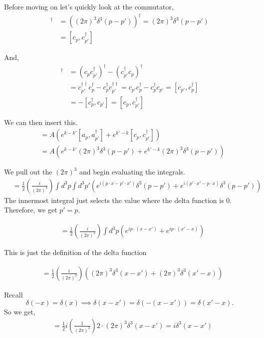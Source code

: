 \documentclass[working, oneside]{../../Preambles/tuftebook}
\begin{document}
\begin{solution}
Before moving on let's quickly look at the commutator,
\begin{align*}
[c_p, c_{p'}^\dagger]^\dagger &= \left( (2\pi)^3 \delta^3(p-p') \right)^\dagger = (2\pi)^3 \delta^3(p-p') \\
&= [c_p, c_{p'}^\dagger]
\end{align*}

And,
\begin{align*}
[c_p, c_{p'}^\dagger]^\dagger &= (c_p c_{p'}^\dagger)^\dagger - (c_{p'}^\dagger c_p)^\dagger \\
&= c_{p'}^{\dagger \dagger} c_p^\dagger - c_p^\dagger c_{p'}^{\dagger \dagger} = c_{p'} c_p^\dagger - c_p^\dagger c_{p'} = [c_{p'}, c_p^\dagger] \\
&= -[c_p^\dagger, c_{p'}] = [c_p, c_{p'}^\dagger]
\end{align*}

We can then insert this.
\begin{align*}
&= A \left( e^{k-k'} [a_p, a_{p'}^\dagger] + e^{k'-k} [c_p, c_{p'}^\dagger] \right) \\
&= A \left( e^{k-k'} (2\pi)^3 \delta^3(p-p') + e^{k'-k} (2\pi)^3 \delta^3(p-p') \right)
\end{align*}

We pull out the $(2\pi)^3$ and begin evaluating the integrals.
\begin{align*}
&= \frac{1}{2} \left( \frac{i}{(2\pi)^3} \right) \int d^3p \int d^3p' \left( e^{i(p\cdot x - p'\cdot x')} \delta^3(p-p') + e^{i(p'\cdot x' - p\cdot x)} \delta^3(p-p') \right)
\end{align*}
The innermost integral just selects the value where the delta function is 0. Therefore, we get $p' = p$.

\begin{align*}
&= \frac{1}{2} \left( \frac{i}{(2\pi)^3} \right) \int d^3p \left( e^{ip\cdot(x-x')} + e^{ip\cdot(x'-x)} \right)
\end{align*}

This is just the definition of the delta function

\begin{align*}
&= \frac{1}{2} \left( \frac{i}{(2\pi)^3} \right) \left( (2\pi)^3 \delta^3(x-x') + (2\pi)^3 \delta^3(x'-x) \right)
\end{align*}

Recall
\[
\delta(-x) = \delta(x) \implies \delta(x-x') = \delta(-(x-x')) = \delta(x'-x)
.\] 
So we get,
\begin{align*}
&= \frac{1}{2} i \left( \frac{1}{(2\pi)^3} \right) 2 \cdot (2\pi)^3 \delta^3(x-x') = i \delta^3(x-x')
\end{align*}
\end{solution}
\end{document}
